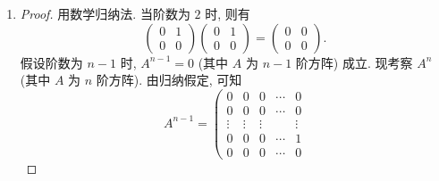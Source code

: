 \begin{enumerate}
        \begin{proof}
            \begin{align*}
                & (I_n - A)(I_n + A + A^2 + \cdots + A^{n-1}) \\
                ={} & (I_n - A)I_n + (I_n - A)A + (I_n - A)A^2 + \cdots + (I_n - A)A^{n-1} \\
                ={} & I_n \cdot I_n - A + A - A^2 + A^2 - A^3 + \cdots + A^{n-1} - A^n \\
                ={} & I_n - A^n \\
                ={} & I_n. \qedhere    
            \end{align*}
        \end{proof}
    \item %
        \begin{proof}
            用数学归纳法. 当阶数为 $2$ 时, 则有
            \[
                \left(
                    \begin{array}{cccc}
                        0 & 1 \\
                        0 & 0
                    \end{array}
                \right)
                \left(
                    \begin{array}{cccc}
                        0 & 1 \\
                        0 & 0
                    \end{array}
                \right)
                =
                \left(
                    \begin{array}{cccc}
                        0 & 0 \\
                        0 & 0
                    \end{array}
                \right).   
            \]
            假设阶数为 $n - 1$ 时, $A^{n-1} = 0$ (其中 $A$ 为 $n-1$ 阶方阵) 成立. 现考察 $A^n$ (其中 $A$ 为 $n$ 阶方阵). 由归纳假定, 可知
            \[
                A^{n-1} =
                \left(
                    \begin{array}{ccccc}
                        0 & 0 & 0 & \cdots & 0 \\
                        0 & 0 & 0 & \cdots & 0 \\
                        \vdots & \vdots & \vdots &  & \vdots \\
                        0 & 0 & 0 & \cdots & 1 \\
                        0 & 0 & 0 & \cdots & 0
                    \end{array}
\]
\end{proof}
\end{enumerate}
